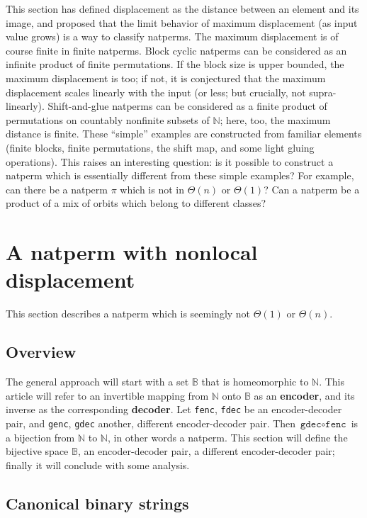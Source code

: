 \documentclass[12pt,reqno]{article}
\begin{document}
This section has defined displacement as the distance between an element and its image, and proposed that the limit behavior of maximum displacement (as input value grows) is a way to classify natperms. The maximum displacement is of course finite in finite natperms. Block cyclic natperms can be considered as an infinite product of finite permutations. If the block size is upper bounded, the maximum displacement is too; if not, it is conjectured that the maximum displacement scales linearly with the input (or less; but crucially, not supra-linearly). Shift-and-glue natperms can be considered as a finite product of permutations on countably nonfinite subsets of $\mathbb{N}$; here, too, the maximum distance is finite. These ``simple'' examples are constructed from familiar elements (finite blocks, finite permutations, the shift map, and some light gluing operations). This raises an interesting question: is it possible to construct a natperm which is essentially different from these simple examples? For example, can there be a natperm $\pi$ which is not in $\Theta(n)$ or $\Theta(1)$? Can a natperm be a product of a mix of orbits which belong to different classes?

\section{A natperm with nonlocal displacement}

This section describes a natperm which is seemingly not $\Theta(1)$ or $\Theta(n)$.

\subsection{Overview}

The general approach will start with a set $\mathbb{B}$ that is homeomorphic to $\mathbb{N}$. This article will refer to an invertible mapping from $\mathbb{N}$ onto $\mathbb{B}$ as an \textbf{encoder}, and its inverse as the corresponding \textbf{decoder}. Let \texttt{fenc}, \texttt{fdec} be an encoder-decoder pair, and \texttt{genc}, \texttt{gdec} another, different encoder-decoder pair. Then $\texttt{gdec} \circ \texttt{fenc}$ is a bijection from $\mathbb{N}$ to $\mathbb{N}$, in other words a natperm. This section will define the bijective space $\mathbb{B}$, an encoder-decoder pair, a different encoder-decoder pair; finally it will conclude with some analysis.

\subsection{Canonical binary strings}
\end{document}
